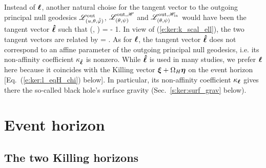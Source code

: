 \begin{remark}
Instead of $\bm{\ell}$, another natural choise for the tangent vector to the outgoing
principal null geodesics $\mathscr{L}^{\rm out}_{(u,\theta,\tilde{{\tilde\varphi}})}$,
$\mathscr{L}^{{\rm out},\mathscr{H}}_{(\theta,\psi)}$ and $\mathscr{L}^{{\rm out},\mathscr{H}_{\rm in}}_{(\theta,\psi)}$
would have been the tangent vector $\bm{\hat{\ell}}$
such that
\be
    (, \w{\hat{\el}}) = - 1.
\ee
In view of (\ref{e:ker:k_scal_ell}), the two tangent vectors are related by
\be
    \w{\hat{\el}} =  \wl .
\ee
As for $\bm{\ell}$, the tangent vector $\bm{\hat{\ell}}$ does not correspond to
an affine parameter of the outgoing
principal null geodesics, i.e. its
non-affinity coefficient $\kappa_{\bm{\hat{\ell}}}$ is nonzero. While
$\bm{\hat{\ell}}$ is used in many studies, we prefer $\bm{\ell}$ here because it
coincides with the Killing vector $\bm{\xi} + \Omega_H \bm{\eta}$
on the event horizon [Eq.~(\ref{e:ker:l_eqH_chi}) below]. In particular, its
non-affinity coefficient $\kappa_{\bm{\ell}}$ gives there the so-called
black hole's surface gravity (Sec.~\ref{s:ker:surf_grav} below).
\end{remark}






\section{Event horizon} \label{s:ker:event_hor_gen}

\subsection{The two Killing horizons} \label{s:ker:Killing_hor}


